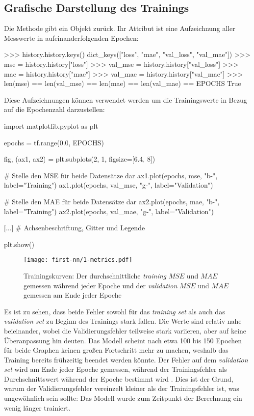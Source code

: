 \subsection{Grafische Darstellung des Trainings}
Die  Methode gibt ein  Objekt zurück.
Ihr  Attribut
ist eine Aufzeichnung aller Messwerte in aufeinanderfolgenden Epochen:
\begin{pyconcode}
>>> history.history.keys()
dict_keys(["loss", "mae", "val_loss", "val_mae"])
>>> mse = history.history["loss"]
>>> val_mse = history.history["val_loss"]
>>> mae = history.history["mae"]
>>> val_mae = history.history["val_mae"]
>>> len(mse) == len(val_mse) == len(mae) == len(val_mae) == EPOCHS
True
\end{pyconcode}
Diese Aufzeichnungen können verwendet werden um die Trainingswerte
in Bezug auf die Epochenzahl darzustellen:
\begin{pythoncode}
import matplotlib.pyplot as plt

epochs = tf.range(0.0, EPOCHS)

fig, (ax1, ax2) = plt.subplots(2, 1, figsize=[6.4, 8])

# Stelle den MSE für beide Datensätze dar
ax1.plot(epochs, mse, "b-", label="Training")
ax1.plot(epochs, val_mse, "g-", label="Validation")

# Stelle den MAE für beide Datensätze dar
ax2.plot(epochs, mae, "b-", label="Training")
ax2.plot(epochs, val_mae, "g-", label="Validation")

[...] # Achsenbeschriftung, Gitter und Legende

plt.show()
\end{pythoncode}
\begin{figure}[h!]
  \centering
  \texttt{[image: first-nn/1-metrics.pdf]}
  \caption{Trainingskurven: Der durchschnittliche \textit{training}
  $MSE$ und $MAE$ gemessen während jeder Epoche
  und der \textit{validation} $MSE$ und $MAE$
  gemessen am Ende jeder Epoche}
\end{figure}
\noindent
Es ist zu sehen, dass beide Fehler sowohl für das
\textit{training set} als auch das \textit{validation set}
zu Beginn des Trainings stark fallen.
Die Werte sind relativ nahe beieinander, wobei die Validierungsfehler
teilweise stark variieren, aber auf keine Überanpassung hin deuten.
Das Modell scheint nach etwa 100 bis 150 Epochen für beide Graphen
keinen großen Fortschritt mehr zu machen, weshalb
das Training bereits frühzeitig beendet werden könnte.
Der Fehler auf dem \textit{validation set} wird
am Ende jeder Epoche gemessen, während der Trainingsfehler als Durchschnittswert
während der Epoche bestimmt wird \parencite[305]{book:hands-on-ml}.
Dies ist der Grund, warum der Validierungsfehler
vereinzelt kleiner als der Trainingsfehler ist, was ungewöhnlich sein sollte:
Das Modell wurde zum Zeitpunkt der Berechnung ein wenig länger trainiert.

